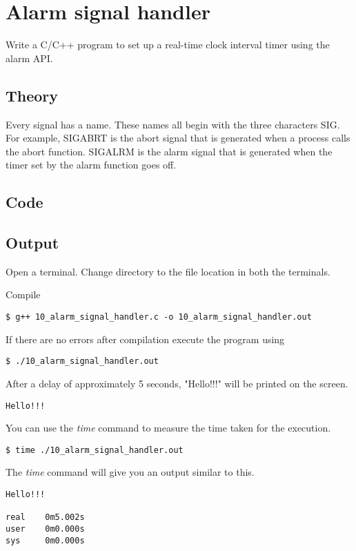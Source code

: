 \chapter{Alarm signal handler}

Write a C/C++ program to set up a real-time clock interval timer using the alarm API.

\section{Theory}

Every signal has a name. These names all begin with the three characters SIG. For example, SIGABRT is the abort signal that is generated when a process calls the abort function. SIGALRM is the alarm signal that is generated when the timer set by the alarm function goes off.

\section{Code}



\section{Output}

Open a terminal. Change directory to the file location in both the terminals.

Compile
\begin{lstlisting}[style=shell-command]
$ g++ 10_alarm_signal_handler.c -o 10_alarm_signal_handler.out
\end{lstlisting}

If there are no errors after compilation execute the program using
\begin{lstlisting}[style=shell-command]
$ ./10_alarm_signal_handler.out
\end{lstlisting}

After a delay of approximately 5 seconds, "Hello!!!" will be printed on the screen.
\begin{lstlisting}[style=shell-output]
Hello!!!
\end{lstlisting}

You can use the \emph{time} command to measure the time taken for the execution.
\begin{lstlisting}[style=shell-command]
$ time ./10_alarm_signal_handler.out
\end{lstlisting}

The \emph{time} command will give you an output similar to this.
\begin{lstlisting}[style=shell-output]
Hello!!!

real    0m5.002s
user    0m0.000s
sys     0m0.000s
\end{lstlisting}
